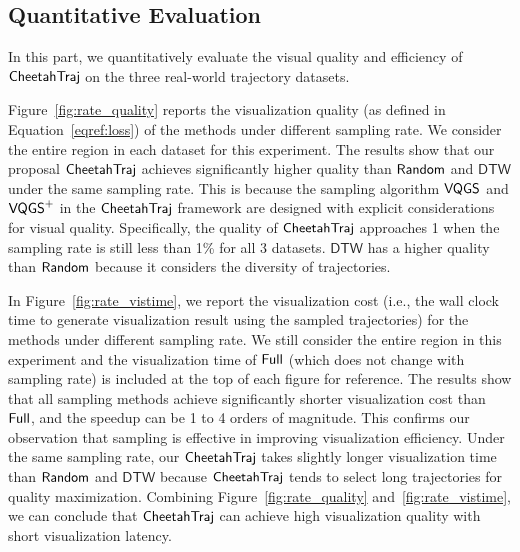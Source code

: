 \subsection{Quantitative Evaluation}\label{sec:quality}
In this part, we quantitatively evaluate the visual quality and efficiency of $\mathsf{CheetahTraj}$ on the three real-world trajectory datasets.

 Figure~\ref{fig:rate_quality} reports the visualization quality (as defined in Equation~\eqref{eqref:loss}) of the methods under different sampling rate.
We consider the entire region in each dataset for this experiment.
The results show that our proposal $\mathsf{CheetahTraj}$ achieves significantly higher quality than $\mathsf{Random}$ and $\mathsf{DTW}$ under the same sampling rate.
This is because the sampling algorithm $\mathsf{VQGS}$ and $\mathsf{VQGS}^+$ in the $\mathsf{CheetahTraj}$ framework are designed with explicit considerations for visual quality.
Specifically, the quality of $\mathsf{CheetahTraj}$ approaches 1 when the sampling rate is still less than 1\% for all 3 datasets.
$\mathsf{DTW}$ has a higher quality than $\mathsf{Random}$ because it considers the diversity of trajectories.


In Figure~\ref{fig:rate_vistime}, we report the visualization cost (i.e., the wall clock time to generate visualization result using the sampled trajectories) for the methods under different sampling rate.
We still consider the entire region in this experiment and the visualization time of $\mathsf{Full}$ (which does not change with sampling rate) is included at the top of each figure for reference.
The results show that all sampling methods achieve significantly shorter visualization cost than $\mathsf{Full}$, and the speedup can be 1 to 4 orders of magnitude.
This confirms our observation that sampling is effective in improving visualization efficiency.
Under the same sampling rate, our $\mathsf{CheetahTraj}$ takes slightly longer visualization time than $\mathsf{Random}$ and $\mathsf{DTW}$
because $\mathsf{CheetahTraj}$ tends to select long trajectories for quality maximization.
Combining Figure~\ref{fig:rate_quality} and~\ref{fig:rate_vistime}, we can conclude that $\mathsf{CheetahTraj}$ can achieve high visualization quality with  short visualization latency.


